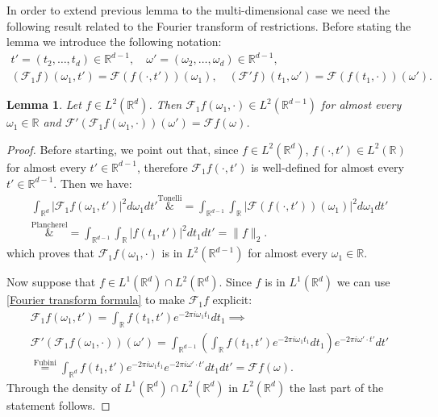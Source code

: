\documentclass[corpo=11pt, stile=classica, tipotesi=custom,
greek, evenboxes, english]{toptesi}
\numberwithin{equation}{chapter}
\newtheorem{lem}[teo]{Lemma}
\theoremstyle{definition}
\theoremstyle{remark}
\newcommand{\R}{\mathbb{R}} %
\newcommand{\F}{\mathscr{F}} %
\begin{document}
In order to extend previous lemma to the multi-dimensional case we need the following result related to the Fourier transform of restrictions. Before stating the lemma we introduce the following notation:
\begin{equation*}
	\begin{gathered}
		t' = (t_2, \ldots, t_d) \in \R^{d-1},\quad \omega' = (\omega_2, \ldots, \omega_d) \in \R^{d-1},\\
		(\F_1 f) (\omega_1, t') = \F(f(\cdot, t'))(\omega_1),\quad (\F' f)(t_1, \omega') = \F (f(t_1, \cdot))(\omega').
	\end{gathered}
\end{equation*}
\begin{lem}\label{Fourier transform for restrictions}
	Let $ f \in L^2(\R^d)$. Then $\F_1 f (\omega_1, \cdot) \in L^2(\R^{d-1})$ for almost every $\omega_1 \in \R$ and $\F' (\F_1 f (\omega_1, \cdot))(\omega') = \F f(\omega)$.
\end{lem}
\begin{proof}
	Before starting, we point out that, since $f \in L^2(\R^d)$, $f(\cdot, t') \in L^2(\R)$ for almost every $t' \in \R^{d-1}$, therefore $\F_1 f(\cdot, t')$ is well-defined for almost every $t' \in \R^{d-1}$. Then we have:
	\begin{align*}
		\int_{\R^d} |\F_1 f (\omega_1, t')|^2 d\omega_1 dt' \overset{\mathrm{Tonelli}}&{=} \int_{\R^{d-1}} \int_{\R} |\F(f(\cdot,t'))(\omega_1)|^2 d\omega_1 dt' \\
																					  \overset{\mathrm{Plancherel}}&{=} \int_{\R^{d-1}} \int_{\R} |f(t_1,t')|^2 dt_1 dt' = \|f\|_2.
	\end{align*}
	which proves that $\F_1 f(\omega_1, \cdot)$ is in $L^2(\R^{d-1})$ for almost every $\omega_1 \in \R$.
	
	Now suppose that $f \in L^1(\R^d) \cap L^2(\R^d)$. Since $f$ is in $L^1(\R^d)$ we can use \eqref{Fourier transform formula} to make $\F_1 f$ explicit:
	\begin{equation*}
	\begin{gathered}
		\F_1 f(\omega_1, t') = \int_{\R} f(t_1,t') e^{-2 \pi i \omega_1 t_1} dt_1 \implies \\
		\F' (\F_1 f(\omega_1, \cdot))(\omega') = \int_{\R^{d-1}} \left(\int_{\R} f(t_1,t') e^{-2 \pi i \omega_1 t_1} dt_1\right) e^{-2 \pi i \omega' \cdot t'} dt' \\
												\overset{\mathrm{Fubini}}{=} \int_{\R^d} f(t_1,t') e^{-2 \pi i \omega_1 t_1} e^{-2 \pi i \omega' \cdot t'} dt_1 dt' = \F f(\omega).
	\end{gathered}
	\end{equation*}
	Through the density of $L^1(\R^d) \cap L^2(\R^d)$ in $L^2(\R^d)$ the last part of the statement follows.
\end{proof}
\end{document}
